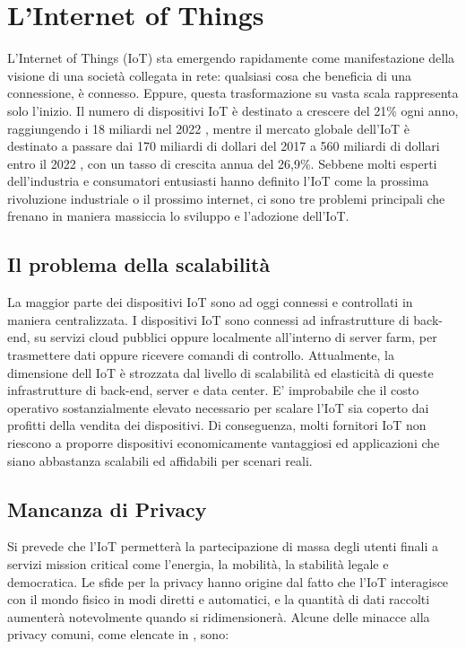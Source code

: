 \documentclass[a4paper,12pt]{article}
\begin{document}
\pagebreak

\tableofcontents

\pagebreak

\section{L'Internet of Things}
L'Internet of Things (IoT) sta emergendo rapidamente come manifestazione della visione di una società collegata in rete: qualsiasi cosa che beneficia di una connessione, è connesso. Eppure, questa trasformazione su vasta scala rappresenta solo l'inizio. Il numero di dispositivi IoT è destinato a crescere del 21\% ogni anno, raggiungendo i 18 miliardi nel 2022 \cite{10}, mentre il mercato globale dell'IoT è destinato a passare dai 170 miliardi di dollari del 2017 a 560 miliardi di dollari entro il 2022 \cite{15}, con un tasso di crescita annua del 26,9\%. Sebbene molti esperti dell'industria e consumatori entusiasti hanno definito l'IoT come la prossima rivoluzione industriale o il prossimo internet, ci sono tre problemi principali che frenano in maniera massiccia lo sviluppo e l'adozione dell'IoT.

\subsection{Il problema della scalabilità}
La maggior parte dei dispositivi IoT sono ad oggi connessi e controllati in maniera centralizzata. I dispositivi IoT sono connessi ad infrastrutture di back-end, su servizi cloud pubblici oppure localmente all'interno di server farm, per trasmettere dati oppure ricevere comandi di controllo.
Attualmente, la dimensione dell IoT è strozzata dal livello di scalabilità ed elasticità di queste infrastrutture di back-end, server e data center. E' improbabile che il costo operativo sostanzialmente elevato necessario per scalare l'IoT sia coperto dai profitti della vendita dei dispositivi. Di conseguenza, molti fornitori IoT non riescono a proporre dispositivi economicamente vantaggiosi ed applicazioni che siano abbastanza scalabili ed affidabili per scenari reali.

\subsection{Mancanza di Privacy}
Si prevede che l'IoT permetterà la partecipazione di massa degli utenti finali a servizi mission critical come l'energia, la  mobilità, la stabilità legale e democratica. Le sfide per la privacy hanno origine dal fatto che l'IoT interagisce con il mondo fisico in modi diretti e automatici, e la quantità di dati raccolti aumenterà notevolmente quando si ridimensionerà. Alcune  delle minacce alla privacy comuni, come elencate in \cite{37}, sono:
\end{document}
